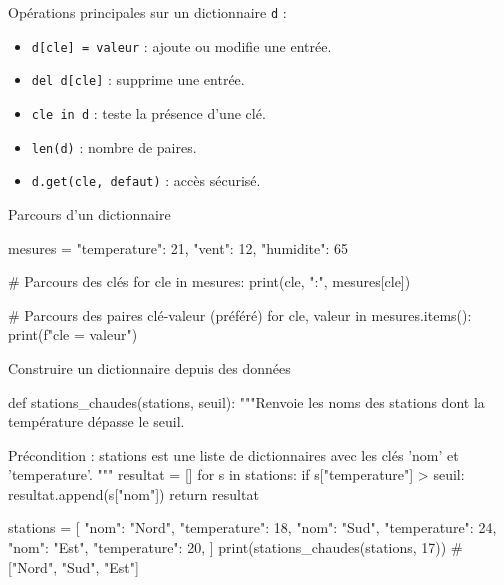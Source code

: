 \begin{nxdef}[D10]
  Opérations principales sur un dictionnaire \lstinline{d} :
  \begin{itemize}
    \item \lstinline{d[cle] = valeur} : ajoute ou modifie une entrée.
    \item \lstinline{del d[cle]} : supprime une entrée.
    \item \lstinline{cle in d} : teste la présence d'une clé.
    \item \lstinline{len(d)} : nombre de paires.
    \item \lstinline{d.get(cle, defaut)} : accès sécurisé.
  \end{itemize}
\end{nxdef}

\begin{codereference}{Parcours d'un dictionnaire}
\begin{python}
mesures = {"temperature": 21, "vent": 12, "humidite": 65}

# Parcours des clés
for cle in mesures:
    print(cle, ":", mesures[cle])

# Parcours des paires clé-valeur (préféré)
for cle, valeur in mesures.items():
    print(f"{cle} = {valeur}")
\end{python}
\end{codereference}


\begin{codereference}{Construire un dictionnaire depuis des données}
\begin{python}
def stations_chaudes(stations, seuil):
    """Renvoie les noms des stations dont la température
    dépasse le seuil.

    Précondition : stations est une liste de dictionnaires
    avec les clés 'nom' et 'temperature'.
    """
    resultat = []
    for s in stations:
        if s["temperature"] > seuil:
            resultat.append(s["nom"])
    return resultat

stations = [
    {"nom": "Nord", "temperature": 18},
    {"nom": "Sud", "temperature": 24},
    {"nom": "Est", "temperature": 20},
]
print(stations_chaudes(stations, 17))  # ["Nord", "Sud", "Est"]
\end{python}
\end{codereference}


